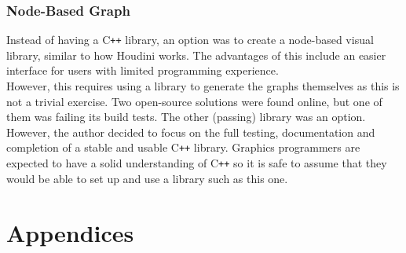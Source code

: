 \documentclass[12pt]{report}
\newcommand{\cpp}{C\texttt{++}}
\theoremstyle{definition}
\begin{document}
    \subsection{Node-Based Graph}

      Instead of having a \cpp{} library, an option was to create a node-based visual
      library, similar to how Houdini works. The advantages of this include an
      easier interface for users with limited programming experience. \\

      However, this requires using a library to generate the graphs themselves
      as this is not a trivial exercise. Two open-source solutions were
      found online, but one of them was failing its build tests. The
      other (passing) library was an option. However, the author
      decided to focus on the full testing, documentation and
      completion of a stable and usable \cpp{} library. Graphics
      programmers are expected to have a solid understanding
      of \cpp{} so it is safe to assume that they would be able
      to set up and use a library such as this one.

  
  

  \chapter*{Appendices}
\end{document}
